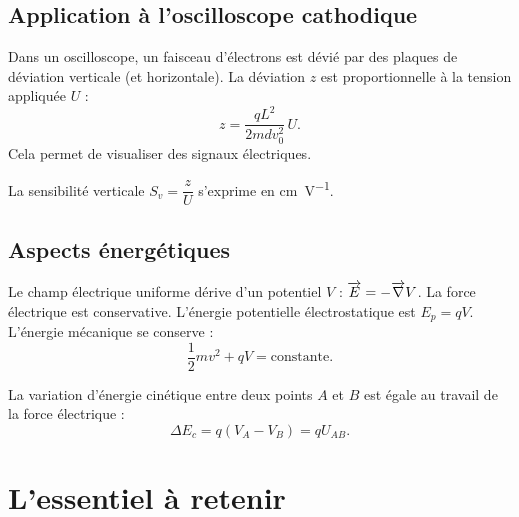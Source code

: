 \subsection{Application à l’oscilloscope cathodique}

Dans un oscilloscope, un faisceau d’électrons est dévié par des plaques de déviation verticale (et horizontale). La déviation $z$ est proportionnelle à la tension appliquée $U$ :
\[
z = \frac{q L^2}{2m d v_0^2}\,U.
\]
Cela permet de visualiser des signaux électriques.

\begin{remarque}
La sensibilité verticale $S_v = \dfrac{z}{U}$ s’exprime en \si{\centi\metre\per\volt}.
\end{remarque}

\subsection{Aspects énergétiques}

Le champ électrique uniforme dérive d’un potentiel $V$ : $\overrightarrow{E} = -\overrightarrow{\nabla}V$. La force électrique est conservative. L’énergie potentielle électrostatique est $E_p = qV$. L’énergie mécanique se conserve :
\[
\frac12 m v^2 + qV = \text{constante}.
\]

\begin{aretenir}
La variation d’énergie cinétique entre deux points $A$ et $B$ est égale au travail de la force électrique :
\[
\Delta E_c = q(V_A - V_B) = qU_{AB}.
\]
\end{aretenir}

\section{L’essentiel à retenir}

